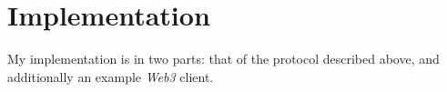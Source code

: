 \section{Implementation}

My implementation is in two parts: that of the protocol described above, and additionally an example \textit{Web3} client.

